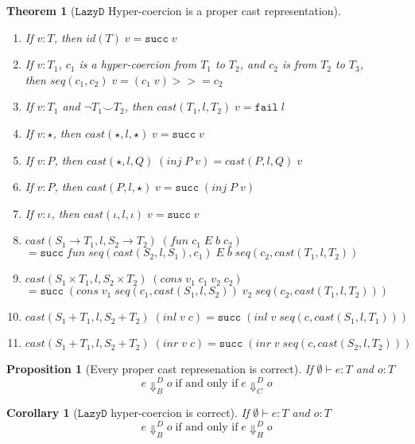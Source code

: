 \documentclass[acmsmall,review,anonymous]{acmart}\settopmatter{printfolios=true,printccs=false,printacmref=false}
\newtheorem{theorem}{Theorem}[]
\newtheorem{proposition}{Proposition}[]
\newtheorem{corollary}{Corollary}[]
\newcommand{\plus}[0]{+}
\newcommand{\judgetype}[3]{#1 \vdash #2 : #3}
\newcommand{\lazyD}{$\mathtt{Lazy D}$}
\begin{document}
\begin{theorem}[\lazyD{} Hyper-coercion is a proper cast representation]
	\  \\
\begin{enumerate}
	\item If $ v : T $, then $ id(T) \; v = \mathtt{succ} \; v $
	\item If $ v : T_1 $,
	$ c_1 $ is a hyper-coercion from $ T_1 $ to $ T_2 $, and 
	$ c_2 $ is from $ T_2 $ to $ T_3 $,\\
	then $ seq(c_1,c_2) \; v = (c_1 \; v) >>= c_2 $
	\item If $ v : T_1 $ and $ \neg T_1 \smile T_2 $,
	then $ cast(T_1, l, T_2) \; v = \mathtt{fail} \; l $
	\item If $ v : \star $, 
	then $ cast(\star,l,\star) \; v = \mathtt{succ} \; v $
	\item If $ v : P $,
	then $ cast(\star,l,Q) \; (inj \; P \; v) = cast(P,l,Q) \; v $
	\item If $ v : P $,
	then $ cast(P,l,\star) \; v = \mathtt{succ} \; (inj \; P \; v) $
	\item If $ v : \iota $,
	then $ cast(\iota,l,\iota) \; v = \mathtt{succ} \; v $
	\item $ cast(S_1 \rightarrow T_1,l,S_2 \rightarrow T_2) \; (fun \; c_1 \; 
	E \; b \; c_2) $ \\
	$ = \mathtt{succ} \; fun \; seq(cast(S_2,l,S_1),c_1) \; E \; b 
	\; seq(c_2,cast(T_1,l,T_2)) $ 
	\item $ cast(S_1 \times T_1,l,S_2 \times T_2) \; (cons \; v_1 \; c_1 \; 
	v_2 \; c_2) $ \\
	$ = \mathtt{succ} \; (cons \; v_1 \; seq(c_1,cast(S_1,l,S_2)) \; v_2 \; 
	seq(c_2,cast(T_1,l,T_2))) $ 
	\item $ cast(S_1 \plus T_1,l,S_2 \plus T_2) \; (inl \; v \; c) = 
	\mathtt{succ} \; (inl \; v \; seq(c,cast(S_1,l,T_1)) ) $ 
	\item $ cast(S_1 \plus T_1,l,S_2 \plus T_2) \; (inr \; v \; c) = 
	\mathtt{succ} \; (inr \; v \; seq(c,cast(S_2,l,T_2)) ) $ 
\end{enumerate}
\end{theorem}

\begin{proposition}[Every proper cast represenation is correct]
	If $ \judgetype{\emptyset}{e}{T} $ and $ o : T $
	\[
	e \Downarrow_{B}^{D} o \; \text{if and only if} \; 
	e \Downarrow_{C}^{D} o
 	\]
\end{proposition}

\begin{corollary}[\lazyD{} hyper-coercion is correct]
	If $ \judgetype{\emptyset}{e}{T} $ and $ o : T $
	\[
	e \Downarrow^{D}_{B} o \; \text{if and only if} \; 
	e \Downarrow^{D}_{H} o
	\]
\end{corollary}
\end{document}
